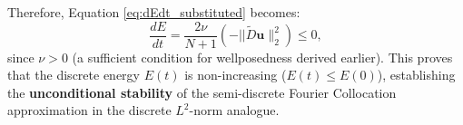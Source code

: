 Therefore, Equation \ref{eq:dEdt_substituted} becomes:
\begin{equation}
\frac{dE}{dt} = \frac{2\nu}{N+1} (-||\tilde{D}\mathbf{u}\|_2^2) \leq 0,
\label{eq:dEdt_final}
\end{equation}
since $\nu > 0$ (a sufficient condition for wellposedness derived earlier).
This proves that the discrete energy $E(t)$ is non-increasing ($E(t) \le E(0)$), establishing the \textbf{unconditional stability} of the semi-discrete Fourier Collocation approximation in the discrete $L^2$-norm analogue.

%
